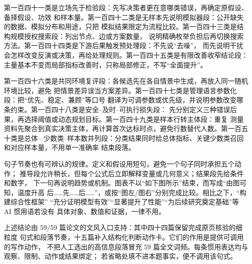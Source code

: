 第一百四十一类是立场先于检验段：先写决策者更在意哪类错误，再确定原假设、备择假设、功效
和样本量。第一百四十二类是无样本先说明模拟器段：公开缺失的数据、模拟分布和用途，只把
模拟结果限定为流程比较。第一百四十三类是结构规模授权搜索段：列出节点、边或方案数量，
说明精确枚举负担后再切换搜索方法。第一百四十四类是下游后果触发预处理段：不先说“去噪”，
而先说明干扰会怎样改变反演或决策，再给处理规则。第一百四十五类是有限改善收窄结论段：
主量基本不变而局部指标改善时，只称局部修正，不写“全面提升”。

第一百四十六类是共同环境复评段：各候选先在各自情景中生成，再放入同一随机环境比较，避免
把情景差异误当方案差异。第一百四十七类是管理语言参数化段：把“优先、稳定、兼顾”等口号
翻译为可调参数或优先级，并说明参数改变哪条约束。第一百四十八类是安全--及时--可执行损失段：
先分别定义三种错误后果，再选择阈值或动态规划目标。第一百四十九类是样本行转主体段：重复
测量资料先聚合到真实决策主体，再计算首次达标时点，避免行数替代人数。第一百五十类是总体--
少数类--样本数并列段：分类结果同时给总体指标、关键少数类召回和对应样本量，不用单一准确率
结束段落。

句子节奏也有可辨认的规律。定义和假设用短句，避免一个句子同时承担五个动作；
推导段允许稍长，但每个公式后立即解释变量或几何意义；结果段先给条件和数字，
下一句再说明趋势或机制。图表不以“如下图所示”结束，而写成“由图可知，温度升高
后……先……后……”，或按“图左/图右”分别完成比较。相比之下，“构建综合性框架”
“充分证明模型有效”“显著提升了性能”“为后续研究奠定基础”等 AI 惯用语若没有
具体对象、数值和证据，一律不用。

上述结论由 59/59 篇论文的文风入口支持：其中四十四篇保留完成原页核验的细粒度
句式和段落节奏，十五篇补入结构化判断动作卡。它们的作用是提供可调用的写作动作，
不把人工选出的高信息段落冒充 59 篇全文词频。每条惯用表达均与观察、限制、动作或结果绑定；
若省略处填不进本题事实，便不调用该句式。


